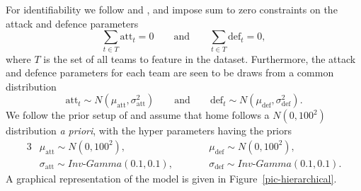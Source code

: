 \documentclass[11pt,a4paper]{article}
\begin{document}
For identifiability we follow \cite{baio_2010} and \cite{karlis_2003}, 
and impose sum to zero constraints on the attack and defence 
parameters 
\[
\sum_{t\in T} \textrm{att}_t = 0 \qquad \textrm{and} \qquad\sum_{t\in T} \textrm{def}_t = 0,
\]
where $T$ is the set of all teams to feature in the dataset. 
Furthermore, the attack and defence parameters for each team are seen 
to be draws from a common distribution 
\[
\textrm{att}_t\sim N\left(\mu_{\textrm{att}}, \sigma_{\textrm{att}}^2\right) \qquad \textrm{and} \qquad \textrm{def}_t\sim N\left(\mu_{\textrm{def}}, \sigma_{\textrm{def}}^2\right).
\]
We follow the prior setup of \cite{baio_2010} and assume that 
$\textrm{home}$ follows a $N(0,100^2)$ distribution 
\emph{a priori}, with the hyper parameters having the priors 
\begin{alignat}{3}
&\mu_{\textrm{att}}\sim N\left(0,100^2\right), &&\qquad \mu_{\textrm{def}}\sim N\left(0,100^2\right), \nonumber\\
&\sigma_{\textrm{att}}\sim Inv\textrm{-}Gamma(0.1,0.1), &&\qquad \sigma_{\textrm{def}}\sim Inv\textrm{-}Gamma(0.1,0.1).\nonumber
\end{alignat}
A graphical representation of the model is 
given in Figure~\ref{pic-hierarchical}. 
\end{document}
